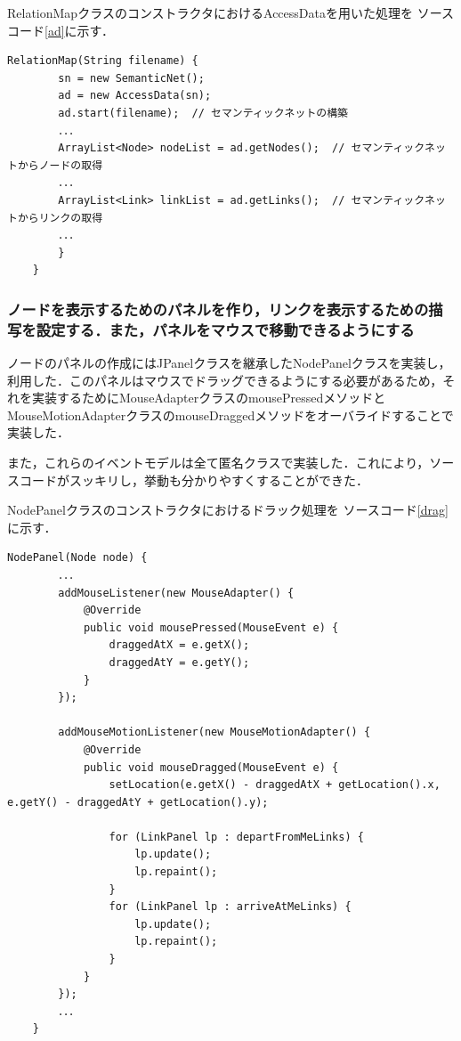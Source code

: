 \documentclass[12pt]{jarticle}
\begin{document}
RelationMapクラスのコンストラクタにおけるAccessDataを用いた処理を
ソースコード\ref{ad}に示す．

\begin{lstlisting}[caption=RelationMapクラスのコンストラクタ, label=ad]
    RelationMap(String filename) {
        sn = new SemanticNet();
        ad = new AccessData(sn);
        ad.start(filename);  // セマンティックネットの構築
        ．．．
        ArrayList<Node> nodeList = ad.getNodes();  // セマンティックネットからノードの取得
        ．．．
        ArrayList<Link> linkList = ad.getLinks();  // セマンティックネットからリンクの取得
        ．．．
        }
    }
\end{lstlisting}

\subsubsection{ノードを表示するためのパネルを作り，リンクを表示するための描写を設定する．また，パネルをマウスで移動できるようにする}
ノードのパネルの作成にはJPanelクラスを継承したNodePanelクラスを実装し，利用した．このパネルはマウスでドラッグできるようにする必要があるため，それを実装するためにMouseAdapterクラスのmousePressedメソッドとMouseMotionAdapterクラスのmouseDraggedメソッドをオーバライドすることで実装した．

また，これらのイベントモデルは全て匿名クラスで実装した．これにより，ソースコードがスッキリし，挙動も分かりやすくすることができた．

NodePanelクラスのコンストラクタにおけるドラック処理を
ソースコード\ref{drag}に示す．

\begin{lstlisting}[caption=NodePanelクラスのコンストラクタ, label=drag]
    NodePanel(Node node) {
        ．．．
        addMouseListener(new MouseAdapter() {
            @Override
            public void mousePressed(MouseEvent e) {
                draggedAtX = e.getX();
                draggedAtY = e.getY();
            }
        });

        addMouseMotionListener(new MouseMotionAdapter() {
            @Override
            public void mouseDragged(MouseEvent e) {
                setLocation(e.getX() - draggedAtX + getLocation().x, e.getY() - draggedAtY + getLocation().y);

                for (LinkPanel lp : departFromMeLinks) {
                    lp.update();
                    lp.repaint();
                }
                for (LinkPanel lp : arriveAtMeLinks) {
                    lp.update();
                    lp.repaint();
                }
            }
        });
        ．．．
    }
\end{lstlisting}
\end{document}

